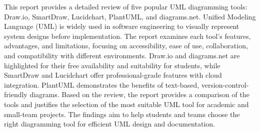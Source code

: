 This report provides a detailed review of five popular UML diagramming tools: Draw.io, SmartDraw, Lucidchart, PlantUML, and diagrams.net. Unified Modeling Language (UML) is widely used in software engineering to visually represent system designs before implementation. The report examines each tool’s features, advantages, and limitations, focusing on accessibility, ease of use, collaboration, and compatibility with different environments. Draw.io and diagrams.net are highlighted for their free availability and suitability for students, while SmartDraw and Lucidchart offer professional-grade features with cloud integration. PlantUML demonstrates the benefits of text-based, version-control-friendly diagrams. Based on the review, the report provides a comparison of the tools and justifies the selection of the most suitable UML tool for academic and small-team projects. The findings aim to help students and teams choose the right diagramming tool for efficient UML design and documentation.